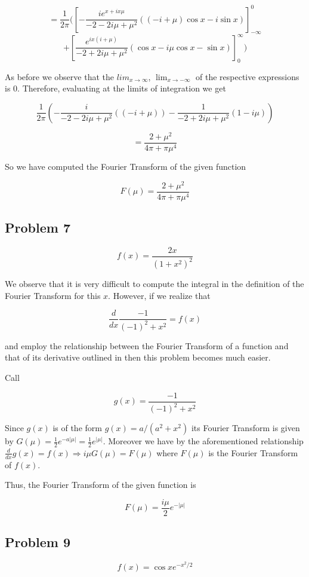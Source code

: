 \documentclass[12pt]{article}
\begin{document}
$$= \frac{1}{2\pi}(  \left[ -\frac{i e^{x+i x \mu } }{-2-2 i \mu +\mu ^2}((-i+\mu ) \cos{x}-i \sin{x}) \right]_{-\infty}^0$$
$$+ \left[ \frac{e^{i x (i+\mu )}}{-2+2 i \mu +\mu ^2} (\cos{x}-i \mu  \cos{x}-\sin{x})  \right]_{0}^\infty  )$$

As before we observe that the $lim_{x \to \infty}$, $\lim_{x \to -\infty}$ of the respective expressions is $0$. Therefore, evaluating at the limits of integration we get

$$\frac{1}{2\pi} \left(   -\frac{i}{-2-2 i \mu +\mu ^2}((-i+\mu )) - \frac{1}{-2+2 i \mu +\mu ^2} (1-i \mu )    \right)$$

$$=\frac{2+\mu ^2}{4 \pi +\pi  \mu ^4}$$

So we have computed the Fourier Transform of the given function

\[F(\mu)=\frac{2+\mu ^2}{4 \pi +\pi  \mu ^4}\]

\subsection{Problem 7}

\[f(x)=\frac{2x}{{(1+x^2)}^2}\]

We observe that it is very difficult to compute the integral in the definition of the Fourier Transform for this $x$. However, if we realize that

\[\frac{d}{dx}\frac{-1}{(-1)^2+x^2}=f(x)\]

and employ the relationship between the Fourier Transform of a function and that of its derivative outlined in \cite[Page 280]{pinsky} then this problem becomes much easier. 

Call 

\[g(x)=\frac{-1}{(-1)^2+x^2}\]

Since $g(x)$ is of the form $g(x)=a/(a^2+x^2)$ its Fourier Transform is given by $G(\mu)=\frac{1}{2}e^{-a|\mu|}=\frac{1}{2}e^{|\mu|}$\cite[Page 285]{pinsky}. Moreover we have by the aforementioned relationship $\frac{d}{dx}g(x)=f(x) \Rightarrow i\mu G(\mu)=F(\mu)$ where $F(\mu)$ is the Fourier Transform of $f(x)$.

Thus, the Fourier Transform of the given function is

\[F(\mu)=\frac{i\mu}{2}e^{-|\mu|} \]

\subsection{Problem 9}

\[f(x)=\cos{x}e^{-x^2/2}\]
\end{document}
